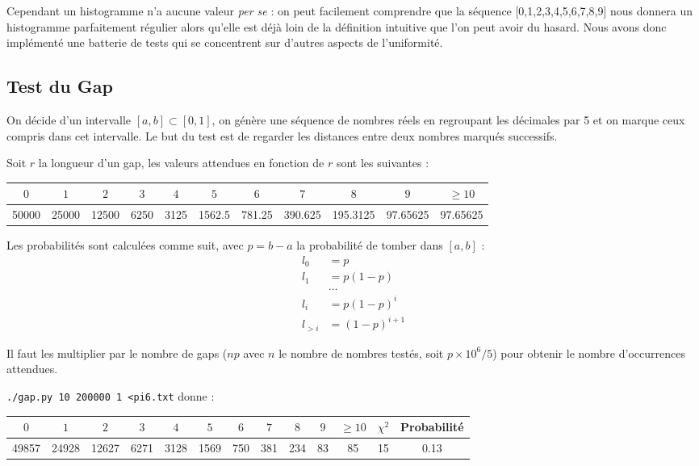 \documentclass[12pt,a4paper]{article}
\begin{document}
Cependant un histogramme n'a aucune valeur \textit{per se} :
on peut facilement comprendre que la séquence [0,1,2,3,4,5,6,7,8,9]
nous donnera un histogramme parfaitement régulier alors qu'elle est déjà loin
de la définition intuitive que l'on peut avoir du hasard.
Nous avons donc implémenté une batterie de tests qui se concentrent
sur d'autres aspects de l'uniformité.

\subsection{Test du Gap}
On décide d'un intervalle $[a,b] \subset [0,1]$,
on génère une séquence de nombres réels en regroupant les décimales par 5
et on marque ceux compris dans cet intervalle. Le but du test est de regarder les
distances entre deux nombres marqués successifs.

\newpage
Soit $r$ la longueur d'un gap,
les valeurs attendues en fonction de $r$ sont les suivantes :
\begin{center}
\begin{tabular}{c|c|c|c|c|c|c|c|c|c|c}
$0$ & $1$ & $2$ & $3$ & $4$ & $5$ & $6$ & $7$ & $8$ & $9$ & $\geq 10$ \\ \hline
50000 & 25000 & 12500 & 6250 & 3125 & 1562.5 & 781.25 & 390.625 &
	195.3125 & 97.65625 & 97.65625
\end{tabular}
\end{center}

Les probabilités sont calculées comme suit,
avec $p=b-a$ la probabilité de tomber dans $[a,b]$ :
\begin{align*}
	l_0 &= p \\
	l_1 &= p(1-p) \\
	& \dots \\
	l_i &= p(1-p)^i\\
	l_{>i} &= (1-p)^{i+1}
\end{align*}

Il faut les multiplier par le nombre de gaps
($np$ avec $n$ le nombre de nombres testés, soit $p\times10^6/5$)
pour obtenir le nombre d'occurrences attendues.

\texttt{./gap.py 10 200000 1 <pi6.txt} donne :
\begin{center}
\begin{tabular}{c|c|c|c|c|c|c|c|c|c|c|c|c}
$0$ & $1$ & $2$ & $3$ & $4$ & $5$ & $6$ & $7$ & $8$ & $9$ & $\geq 10$ &
	$\chi^2$ & Probabilité \\ \hline
49857 & 24928 & 12627 & 6271 & 3128 & 1569 & 750 & 381 & 234 & 83 & 85 &
	15 &  0.13
\end{tabular}
\end{center}
\end{document}
